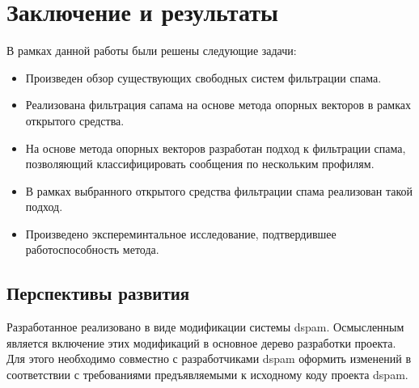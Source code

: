 \newpage
\section{Заключение и результаты}


В рамках данной	работы были решены следующие задачи:
\begin{itemize}
\item Произведен обзор существующих свободных систем фильтрации спама.
\item Реализована фильтрация сапама на основе метода опорных векторов в рамках открытого средства.
\item На основе метода опорных векторов разработан подход к фильтрации спама, позволяющий классифицировать сообщения по нескольким профилям.
\item В рамках выбранного открытого средства фильтрации спама реализован такой подход.
\item Произведено экспереминтальное исследование, подтвердившее работоспособность метода.
\end{itemize}

\subsection{Перспективы развития}

Разработанное реализовано в виде модификации системы dspam. Осмысленным является включение этих модификаций в основное дерево разработки проекта. Для этого необходимо совместно с разработчиками dspam оформить изменений в соответствии с требованиями предъявляемыми к исходному коду проекта dspam. 
